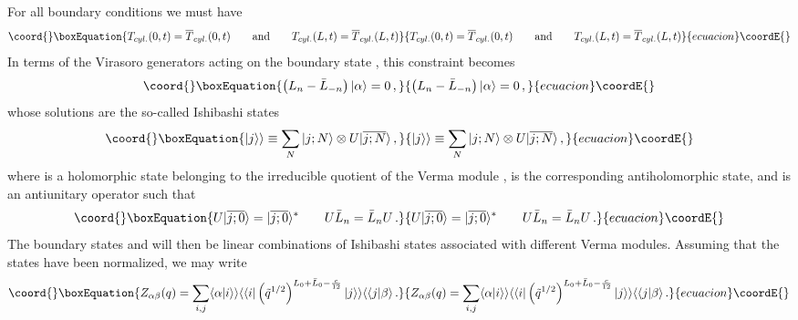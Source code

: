 \documentclass[a4paper,12pt]{report}
\begin{document}
For all boundary conditions we must have
\begin{equation}\coord{}\boxEquation{
T_{cyl.}(0,t)=\overline{T}_{cyl.}(0,t)\qquad \textrm{and}\qquad T_{cyl.}(L,t)=\overline{T}_{cyl.}(L,t)
}{
T_{cyl.}(0,t)=\overline{T}_{cyl.}(0,t)\qquad \textrm{and}\qquad T_{cyl.}(L,t)=\overline{T}_{cyl.}(L,t)
}{ecuacion}\coordE{}\end{equation}
In terms of the Virasoro generators acting on the boundary state \myHighlight{$|\alpha\rangle$}\coordHE{}, this constraint becomes
\begin{equation}\coord{}\boxEquation{
\left(L_{n}-\bar{L}_{-n}\right)|\alpha\rangle=0\,,
}{
\left(L_{n}-\bar{L}_{-n}\right)|\alpha\rangle=0\,,
}{ecuacion}\coordE{}\end{equation}
whose solutions are the so-called Ishibashi states
\begin{equation}\coord{}\boxEquation{
|j\rangle\rangle\equiv\sum_{N}|j;N\rangle\otimes U |\overline{j;N}\rangle\,,
}{
|j\rangle\rangle\equiv\sum_{N}|j;N\rangle\otimes U |\overline{j;N}\rangle\,,
}{ecuacion}\coordE{}\end{equation}
where \coordHE{} is a holomorphic state belonging to the irreducible quotient of the Verma module \coordHE{},
\coordHE{} is the corresponding antiholomorphic state, and \coordHE{} is an antiunitary operator such that
\begin{equation}\coord{}\boxEquation{
U|\overline{j;0}\rangle=|\overline{j;0}\rangle^{*}\qquad U\bar{L}_{n}=\bar{L}_{n}U\,.
}{
U|\overline{j;0}\rangle=|\overline{j;0}\rangle^{*}\qquad U\bar{L}_{n}=\bar{L}_{n}U\,.
}{ecuacion}\coordE{}\end{equation}
The boundary states \myHighlight{$|\alpha\rangle$}\coordHE{} and \myHighlight{$|\beta\rangle$}\coordHE{} will then be linear combinations of Ishibashi states
associated with different Verma modules. Assuming that the states \coordHE{} have been normalized, we may
write
\begin{equation}\coord{}\boxEquation{
Z_{\alpha\beta}(q)=\sum_{i,j}\langle\alpha|i\rangle\rangle\langle\langle i|
\left(\tilde{q}^{1/2}\right)^{L_{0}+\bar{L}_{0}-\frac{c}{12}}|j\rangle\rangle\langle\langle j|\beta\rangle\,.
}{
Z_{\alpha\beta}(q)=\sum_{i,j}\langle\alpha|i\rangle\rangle\langle\langle i|
\left(\tilde{q}^{1/2}\right)^{L_{0}+\bar{L}_{0}-\frac{c}{12}}|j\rangle\rangle\langle\langle j|\beta\rangle\,.
}{ecuacion}\coordE{}\end{equation}
\end{document}
